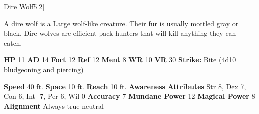   
  \begin{monsection}{Dire Wolf}{5}[2]
    \vspace{-1em}\vspace{-1em}
    \vspace{0em}

    
        A dire wolf is a Large wolf-like creature.
        Their fur is usually mottled gray or black.
        Dire wolves are efficient pack hunters that will kill anything they can catch.
      

    \begin{spellcontent}
      \begin{spelltargetinginfo}
        \pari \textbf{HP} 11 \monsep
          \textbf{AD} 14 \monsep
          \textbf{Fort} 12 \monsep
          \textbf{Ref} 12 \monsep
          \textbf{Ment} 8
        \pari \textbf{WR} 10 \monsep
        \textbf{VR} 30
        \pari \textbf{Strike:}
            Bite  (4d10 bludgeoning and piercing)
      \end{spelltargetinginfo}
    \end{spellcontent}
    \begin{monsterfooter}
      \pari \textbf{Speed} 40 ft. \monsep
        \textbf{Space} 10 ft. \monsep
        \textbf{Reach} 10 ft.
      \pari \textbf{Awareness} 
      \pari \textbf{Attributes}
        Str 8, Dex 7,
        Con 6, Int -7,
        Per 6, Wil 0
      \pari \textbf{Accuracy} 7 \monsep
        \textbf{Mundane Power} 12 \monsep
      \textbf{Magical Power} 8
      \pari \textbf{Alignment} Always true neutral
    \end{monsterfooter}
  \end{monsection}
  
